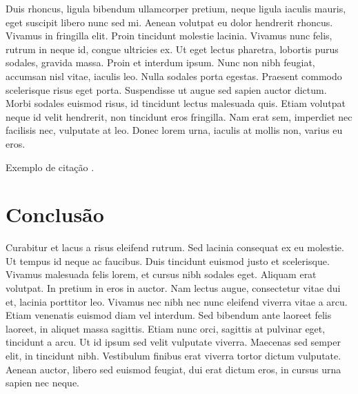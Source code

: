 \documentclass[
	12pt,				%
	openright,			%
	oneside,			%
	a4paper,			%
	chapter=TITLE,		%
	english,			%
	brazil,				%
	]{abntex2}
\begin{document}
Duis rhoncus, ligula bibendum ullamcorper pretium, neque ligula iaculis mauris, eget suscipit libero nunc sed mi. Aenean volutpat eu dolor hendrerit rhoncus. Vivamus in fringilla elit. Proin tincidunt molestie lacinia. Vivamus nunc felis, rutrum in neque id, congue ultricies ex. Ut eget lectus pharetra, lobortis purus sodales, gravida massa. Proin et interdum ipsum. Nunc non nibh feugiat, accumsan nisl vitae, iaculis leo. Nulla sodales porta egestas. Praesent commodo scelerisque risus eget porta. Suspendisse ut augue sed sapien auctor dictum. Morbi sodales euismod risus, id tincidunt lectus malesuada quis. Etiam volutpat neque id velit hendrerit, non tincidunt eros fringilla. Nam erat sem, imperdiet nec facilisis nec, vulputate at leo. Donec lorem urna, iaculis at mollis non, varius eu eros.

Exemplo de citação \cite{neumann}.


\chapter{Conclusão}

Curabitur et lacus a risus eleifend rutrum. Sed lacinia consequat ex eu molestie. Ut tempus id neque ac faucibus. Duis tincidunt euismod justo et scelerisque. Vivamus malesuada felis lorem, et cursus nibh sodales eget. Aliquam erat volutpat. In pretium in eros in auctor. Nam lectus augue, consectetur vitae dui et, lacinia porttitor leo. Vivamus nec nibh nec nunc eleifend viverra vitae a arcu. Etiam venenatis euismod diam vel interdum. Sed bibendum ante laoreet felis laoreet, in aliquet massa sagittis. Etiam nunc orci, sagittis at pulvinar eget, tincidunt a arcu. Ut id ipsum sed velit vulputate viverra. Maecenas sed semper elit, in tincidunt nibh. Vestibulum finibus erat viverra tortor dictum vulputate. Aenean auctor, libero sed euismod feugiat, dui erat dictum eros, in cursus urna sapien nec neque.

\postextual




	
	
\end{document}
